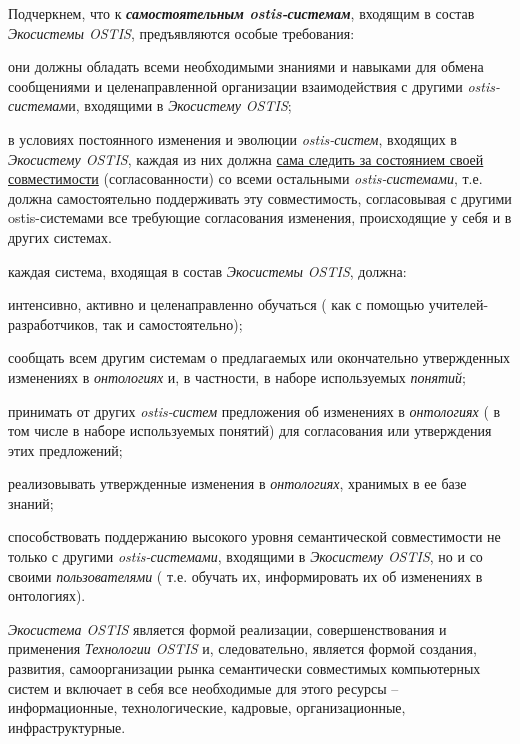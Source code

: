 \begin{SCn}
{Подчеркнем, что к \textit{\textbf{самостоятельным ostis-системам}}, входящим в состав \textit{Экосистемы OSTIS}, предъявляются особые требования:
\begin{scnitemize}
    \item они должны обладать всеми необходимыми знаниями и навыками для обмена сообщениями и целенаправленной организации взаимодействия с другими \textit{ostis-системам}и, входящими в \textit{Экосистему OSTIS};
    \item в условиях постоянного изменения и эволюции \textit{ostis-систем}, входящих в \textit{Экосистему OSTIS}, каждая из них должна \uline{сама следить за состоянием своей совместимости} (согласованности) со всеми остальными \textit{ostis-системами},  т.е. должна самостоятельно поддерживать эту совместимость, согласовывая с другими ostis-системами все требующие согласования изменения, происходящие у себя и в других системах.
    \item каждая система, входящая в состав \textit{Экосистемы OSTIS}, должна:
    \begin{scnitemizeii}
        \item интенсивно, активно и целенаправленно обучаться ( как с помощью  учителей-разработчиков, так и самостоятельно);
        \item сообщать всем другим системам о предлагаемых или окончательно утвержденных изменениях в \textit{онтологиях} и, в частности, в наборе используемых \textit{понятий};
        \item принимать от других \textit{ostis-систем} предложения об изменениях в \textit{онтологиях} ( в том числе в наборе используемых понятий) для согласования или утверждения этих предложений;
        \item реализовывать утвержденные изменения в \textit{онтологиях}, хранимых в ее базе знаний;
        \item способствовать поддержанию высокого уровня семантической совместимости не только с другими \textit{ostis-системами}, входящими в \textit{Экосистему OSTIS}, но и со своими \textit{пользователями} ( т.е. обучать их, информировать их об изменениях в онтологиях).
    \end{scnitemizeii}
\end{scnitemize}

\textit{Экосистема OSTIS} является формой реализации, совершенствования и применения \textit{Технологии OSTIS} и, следовательно, является формой создания, развития, самоорганизации рынка семантически совместимых компьютерных систем  и включает в себя все необходимые для этого ресурсы --  информационные, технологические, кадровые, организационные, инфраструктурные. 

}
\end{SCn}
